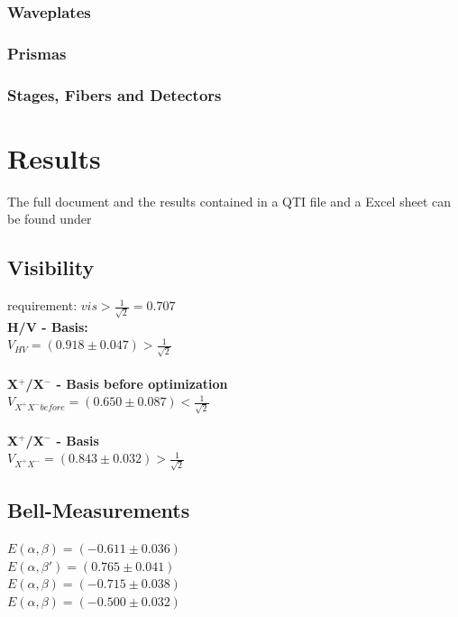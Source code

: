 \documentclass[12pt,a4paper]{article}
\begin{document}
\begin{multicols}{2}
\subsubsection{Waveplates}
\subsubsection{Prismas}
\subsubsection{Stages, Fibers and Detectors}

\section{Results}
The full document and the results contained in a QTI file and a Excel sheet can be found under \cite{github}
\subsection{Visibility}
requirement: $vis > \frac{1}{\sqrt{2}} = 0.707$\\

\noindent \textbf{H/V - Basis:}\\

$V_{HV}= (0.918 \pm 0.047) > \frac{1}{\sqrt{2}}$\\
\\
\textbf{X$^+$/X$^-$ - Basis before optimization}\\

$V_{X^+ X^- before}=(0.650 \pm 0.087) < \frac{1}{\sqrt{2}}$\\
\\
\textbf{X$^+$/X$^-$ - Basis}\\

$V_{X^+ X^- }=(0.843 \pm 0.032) > \frac{1}{\sqrt{2}}$\\

\subsection{Bell-Measurements}
$E(\alpha, \beta) = (-0.611 \pm 0.036)$\\
$E(\alpha, \beta ') = (0.765 \pm 0.041)$\\
$E(\alpha, \beta) = (-0.715\pm 0.038)$\\
$E(\alpha, \beta) = (-0.500 \pm 0.032)$\\


\end{multicols}
\end{document}
